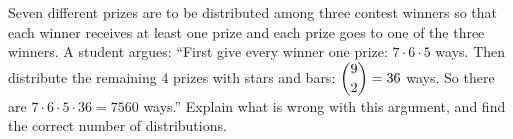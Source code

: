Seven different prizes are to be distributed among three contest winners so that each winner receives at least one prize and each prize goes to one of the three winners. A student argues: ``First give every winner one prize: $7\cdot6\cdot5$ ways. Then distribute the remaining $4$ prizes with stars and bars: $\dbinom92=36$ ways. So there are $7\cdot6\cdot5\cdot36=7560$ ways.'' Explain what is wrong with this argument, and find the correct number of distributions.
